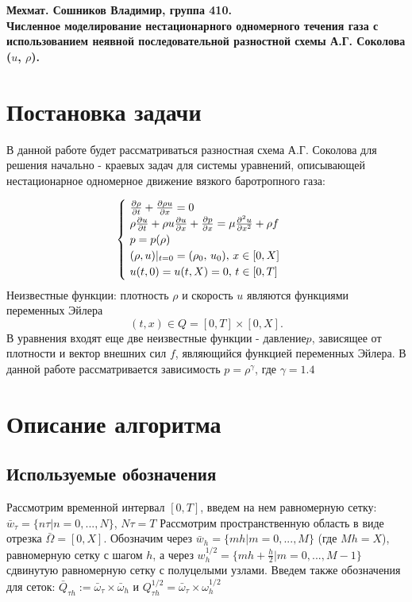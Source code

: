 \documentclass[12pt]{article}
\begin{document}
\begin{center} \large \bf
Мехмат. Сошников Владимир, группа 410.\\
Численное моделирование нестационарного одномерного течения газа с использованием неявной последовательной разностной схемы А.Г. Соколова   ($u$, $\rho$). 
\end{center}

\section{Постановка задачи}

В данной работе будет рассматриваться разностная схема А.Г. Соколова для решения начально - краевых задач для системы уравнений, описывающей нестационарное одномерное движение вязкого баротропного газа:

\begin{equation*}
 \begin{cases}
   \text
     {
       $
         \frac {\partial \rho} {\partial t} + 
         \frac {\partial \rho u} {\partial x} = 
         0
       $
     }
   \\
   \text 
     {
       $
          \rho \frac {\partial u} {\partial t} +
          \rho u \frac {\partial u} {\partial x} + 
          \frac {\partial p} {\partial x} =
          \mu \frac {\partial^{2} u} {\partial x ^{2}} +
          \rho f
       $
     }
   \\
   \text 
     {
       $
         p = p (\rho)
       $
     } 
   \\
   \text 
     {
       $
        (\rho, u)|_{t = 0} = (\rho_{0}, \,u_{0}), \,  x \in [0, X]
       $
     } 
   \\
   \text 
     {
       $
        u (t, 0) = u (t, X) = 0, \,t \in [0, T]
       $
     } 
 \end{cases}
\end{equation*}
Неизвестные функции: плотность $\rho$ и скорость $u$ являются функциями переменных Эйлера
$$
(t,x) \in Q = [0,T] \times [0,X].
$$
В уравнения входят еще две неизвестные функции - давление$p$, зависящее от плотности и вектор внешних сил $f$, являющийся функцией переменных Эйлера.
В данной работе рассматривается зависимость $p = \rho ^{\gamma}$, где $\gamma = 1.4$
\section{Описание алгоритма}
\subsection{Используемые обозначения}
Рассмотрим временной интервал $[0,T]$, введем на нем равномерную сетку:
$ \bar w_{\tau} = \{n \tau | n = 0,...,N\}$, $N \tau = T$
Рассмотрим пространственную область в виде отрезка $\bar \Omega = [0, X]$. Обозначим  через $\bar w_{h} = \{mh|m = 0,...,M\}$ (где $Mh = X$), равномерную сетку с шагом $h$, а
через $w_{h}^{1/2} = \{mh + \frac{h}{2} | m = 0,..., M - 1\}$ сдвинутую равномерную сетку с полуцелыми узлами.
Введем также обозначения для сеток:
$
\bar Q_{\tau h} := \bar \omega_{\tau} \times \bar \omega_{h}
$
и 
$
Q_{\tau h}^{1/2} = \bar \omega_{\tau} \times \omega_{h}^{1/2}
$
\end{document}

